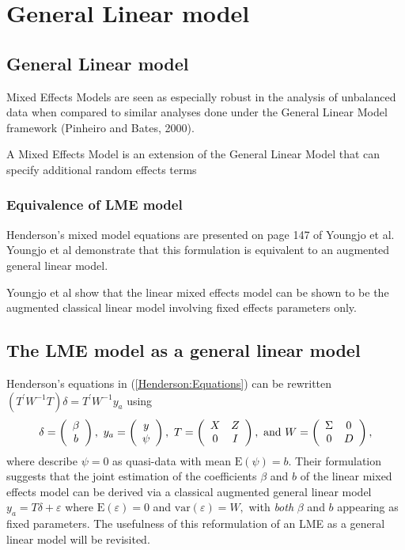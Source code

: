 \documentclass[12pt, a4paper]{article}
\begin{document}



\chapter{General Linear model}
\section{General Linear model} Mixed Effects Models are seen as
especially robust in the analysis of unbalanced data when compared
to similar analyses done under the General Linear Model framework
(Pinheiro and Bates, 2000).

A Mixed Effects Model is an extension of the General Linear Model
that can specify additional random effects terms

\subsection{Equivalence of LME model}
Henderson's mixed model equations are presented on page 147 of
Youngjo et al. Youngjo et al demonstrate that this formulation is
equivalent to an augmented general linear model.

Youngjo et al show that the linear mixed effects model can be
shown to be the augmented classical linear model involving fixed
effects parameters only.
\section{The LME model as a general linear model}
Henderson's equations in (\ref{Henderson:Equations}) can be rewritten $( T^\prime W^{-1} T ) \delta = T^\prime W^{-1} y_{a} $ using
\[
\delta = \left(\begin{array}{c}\beta \\ b \end{array}\right),
\ y_{a} = \left(\begin{array}{c}
y \cr \psi
\end{array}\right),
\ T = \left(\begin{array}{cc}
X & Z  \\
0 & I
\end{array}\right),
\ \textrm{and} \ W = \left(\begin{array}{cc}
\Sigma & 0  \cr
0 &  D \end{array}\right),
\]
where \cite{Lee:Neld:Pawi:2006} describe $\psi = 0$ as quasi-data with mean $\mathrm{E}(\psi) = b.$ Their formulation suggests that the joint estimation of the coefficients $\beta$ and $b$ of the linear mixed effects model can be derived via a classical augmented general linear model $y_{a} = T\delta + \varepsilon$ where $\mathrm{E}(\varepsilon) = 0$ and $\mathrm{var}(\varepsilon) = W,$ with \emph{both} $\beta$ and $b$ appearing as fixed parameters. The usefulness of this reformulation of an LME as a general linear model will be revisited.
\end{document}
